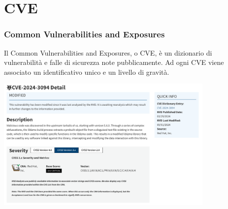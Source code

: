 
\section{CVE} %


\begin{frame}
\frametitle{Common Vulnerabilities and Exposures}
Il Common Vulnerabilities and Exposures, o CVE,
è un dizionario di vulnerabilità e falle di sicurezza note pubblicamente.
Ad ogni CVE viene associato un identificativo unico e un livello di gravità.
\begin{center}
    \includegraphics[width=0.8\textwidth]{img/1-CVE/CVE.png}
\end{center}


\end{frame}

